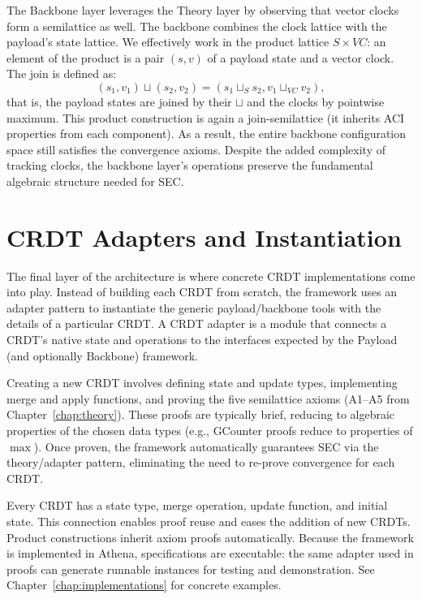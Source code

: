 The Backbone layer leverages the Theory layer by observing that vector clocks form a semilattice as well. The backbone combines the clock lattice with the payload's state lattice. We effectively work in the product lattice $S \times VC$: an element of the product is a pair $(s, v)$ of a payload state and a vector clock. The join is defined as:
\[
  (s_1, v_1)\sqcup(s_2, v_2) = (s_1\sqcup_S s_2, v_1\sqcup_{VC} v_2),
\]
that is, the payload states are joined by their $\sqcup$ and the clocks by pointwise maximum. This product construction is again a join-semilattice (it inherits ACI properties from each component). As a result, the entire backbone configuration space still satisfies the convergence axioms. Despite the added complexity of tracking clocks, the backbone layer's operations preserve the fundamental algebraic structure needed for SEC.

\section{CRDT Adapters and Instantiation}
\label{sec:crdt-adapters}

The final layer of the architecture is where concrete CRDT implementations come into play. Instead of building each CRDT from scratch, the framework uses an adapter pattern to instantiate the generic payload/backbone tools with the details of a particular CRDT. A CRDT adapter is a  module that connects a CRDT's native state and operations to the interfaces expected by the Payload (and optionally Backbone) framework.

Creating a new CRDT involves defining state and update types, implementing merge and apply functions, and proving the five semilattice axioms (A1--A5 from Chapter~\ref{chap:theory}). These proofs are typically brief, reducing to algebraic properties of the chosen data types (e.g., GCounter proofs reduce to properties of $\max$). Once proven, the framework automatically guarantees SEC via the theory/adapter pattern, eliminating the need to re-prove convergence for each CRDT.

Every CRDT has a state type, merge operation, update function, and initial state. This connection enables proof reuse and eases the addition of new CRDTs. Product constructions inherit axiom proofs automatically. Because the framework is implemented in Athena, specifications are executable: the same adapter used in proofs can generate runnable instances for testing and demonstration. See Chapter~\ref{chap:implementations} for concrete examples.

\endinput
